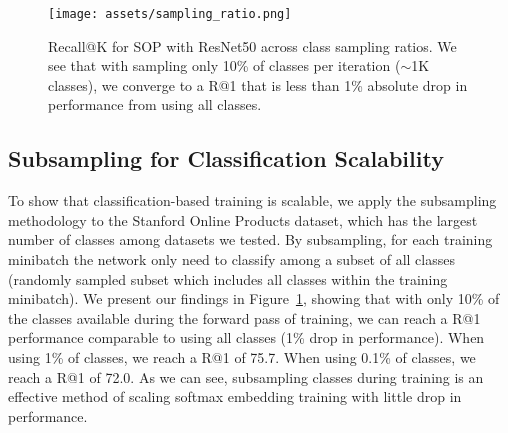 \documentclass{bmvc2k}
\begin{document}
  \begin{figure}
 \centering
 \texttt{[image: assets/sampling\_ratio.png]}
 \caption{Recall@K for SOP with ResNet50 across class sampling ratios. We see that with sampling only 10\% of classes per iteration ($\sim$1K classes), we converge to a R@1 that is less than 1\% absolute drop in performance from using all classes.}
  \label{fig:sampling_ratio}
 \end{figure}

\subsection{Subsampling for Classification Scalability}
\label{sec:sampling_ratio}

To show that classification-based training is scalable, we apply the subsampling methodology to the Stanford Online Products dataset, which has the largest number of classes among datasets we tested. By subsampling, for each training minibatch the network only need to classify among a subset of all classes (randomly sampled subset which includes all classes within the training minibatch). We present our findings in Figure~\ref{fig:sampling_ratio}, showing that with only 10\% of the classes available during the forward pass of training, we can reach a R@1 performance comparable to using all classes (1\% drop in performance). When using 1\% of classes, we reach a R@1 of 75.7. When using 0.1\% of classes, we reach a R@1 of 72.0. As we can see, subsampling classes during training is an effective method of scaling softmax embedding training with little drop in performance.
\end{document}
